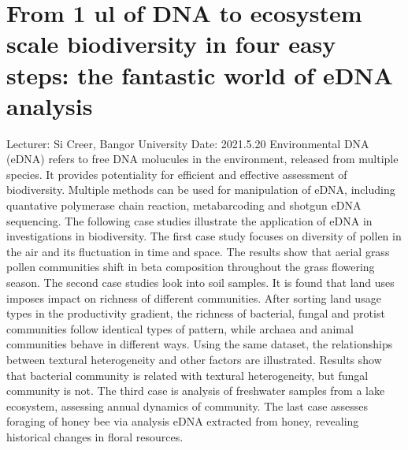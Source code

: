 \documentclass[11pt]{article}
\begin{document}
  \section{From 1 ul of DNA to ecosystem scale biodiversity in four easy steps: the fantastic world of eDNA analysis}
  Lecturer: Si Creer, Bangor University
  \newline
  Date: 2021.5.20
  \newline
  Environmental DNA (eDNA) refers to free DNA molucules in the environment, released from multiple species. 
  It provides potentiality for efficient and effective assessment of biodiversity. 
  Multiple methods can be used for manipulation of eDNA, including quantative polymerase chain reaction, metabarcoding and shotgun eDNA sequencing. 
  The following case studies illustrate the application of eDNA in investigations in biodiversity.
  \newline
  The first case study focuses on diversity of pollen in the air and its fluctuation in time and space. 
  The results show that aerial grass pollen communities shift in beta composition throughout the grass flowering season. 
  The second case studies look into soil samples. 
  It is found that land uses imposes impact on richness of different communities. 
  After sorting land usage types in the productivity gradient, the richness of bacterial, fungal and protist communities follow identical types of pattern, while archaea and animal communities behave in different ways. 
  Using the same dataset, the relationships between textural heterogeneity and other factors are illustrated. 
  Results show that bacterial community is related with textural heterogeneity, but fungal community is not. 
  The third case is analysis of freshwater samples from a lake ecosystem, assessing annual dynamics of community. 
  The last case assesses foraging of honey bee via analysis eDNA extracted from honey, revealing historical changes in floral resources.

  \newpage
\end{document}
